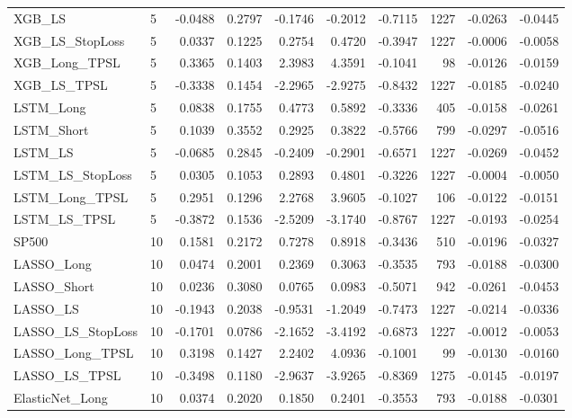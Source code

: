 \begin{tabular}{llrrrrrrrr}
\cline{1-10}
XGB\_LS & 5 & -0.0488 & 0.2797 & -0.1746 & -0.2012 & -0.7115 & 1227 & -0.0263 & -0.0445 \\
\cline{1-10}
XGB\_LS\_StopLoss & 5 & 0.0337 & 0.1225 & 0.2754 & 0.4720 & -0.3947 & 1227 & -0.0006 & -0.0058 \\
\cline{1-10}
XGB\_Long\_TPSL & 5 & 0.3365 & 0.1403 & 2.3983 & 4.3591 & -0.1041 & 98 & -0.0126 & -0.0159 \\
\cline{1-10}
XGB\_LS\_TPSL & 5 & -0.3338 & 0.1454 & -2.2965 & -2.9275 & -0.8432 & 1227 & -0.0185 & -0.0240 \\
\cline{1-10}
LSTM\_Long & 5 & 0.0838 & 0.1755 & 0.4773 & 0.5892 & -0.3336 & 405 & -0.0158 & -0.0261 \\
\cline{1-10}
LSTM\_Short & 5 & 0.1039 & 0.3552 & 0.2925 & 0.3822 & -0.5766 & 799 & -0.0297 & -0.0516 \\
\cline{1-10}
LSTM\_LS & 5 & -0.0685 & 0.2845 & -0.2409 & -0.2901 & -0.6571 & 1227 & -0.0269 & -0.0452 \\
\cline{1-10}
LSTM\_LS\_StopLoss & 5 & 0.0305 & 0.1053 & 0.2893 & 0.4801 & -0.3226 & 1227 & -0.0004 & -0.0050 \\
\cline{1-10}
LSTM\_Long\_TPSL & 5 & 0.2951 & 0.1296 & 2.2768 & 3.9605 & -0.1027 & 106 & -0.0122 & -0.0151 \\
\cline{1-10}
LSTM\_LS\_TPSL & 5 & -0.3872 & 0.1536 & -2.5209 & -3.1740 & -0.8767 & 1227 & -0.0193 & -0.0254 \\
\cline{1-10}
SP500 & 10 & 0.1581 & 0.2172 & 0.7278 & 0.8918 & -0.3436 & 510 & -0.0196 & -0.0327 \\
\cline{1-10}
LASSO\_Long & 10 & 0.0474 & 0.2001 & 0.2369 & 0.3063 & -0.3535 & 793 & -0.0188 & -0.0300 \\
\cline{1-10}
LASSO\_Short & 10 & 0.0236 & 0.3080 & 0.0765 & 0.0983 & -0.5071 & 942 & -0.0261 & -0.0453 \\
\cline{1-10}
LASSO\_LS & 10 & -0.1943 & 0.2038 & -0.9531 & -1.2049 & -0.7473 & 1227 & -0.0214 & -0.0336 \\
\cline{1-10}
LASSO\_LS\_StopLoss & 10 & -0.1701 & 0.0786 & -2.1652 & -3.4192 & -0.6873 & 1227 & -0.0012 & -0.0053 \\
\cline{1-10}
LASSO\_Long\_TPSL & 10 & 0.3198 & 0.1427 & 2.2402 & 4.0936 & -0.1001 & 99 & -0.0130 & -0.0160 \\
\cline{1-10}
LASSO\_LS\_TPSL & 10 & -0.3498 & 0.1180 & -2.9637 & -3.9265 & -0.8369 & 1275 & -0.0145 & -0.0197 \\
\cline{1-10}
ElasticNet\_Long & 10 & 0.0374 & 0.2020 & 0.1850 & 0.2401 & -0.3553 & 793 & -0.0188 & -0.0301 \\

\end{tabular}
